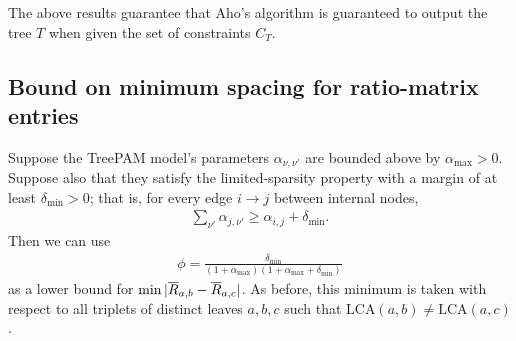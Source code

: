 \documentclass{article}
\theoremstyle{definition}
\newcommand{\deltaMin}{\delta_{\text{min}}}
\newcommand{\alphaMax}{\alpha_{\text{max}}}
\newcommand{\LCA}{\text{LCA}}
\begin{document}
The above results guarantee that Aho's algorithm is guaranteed to output the tree $T$ when given the set of constraints $C_T$.


\subsection{Bound on minimum spacing for ratio-matrix entries}
\label{sec:minimum-spacing}
Suppose the TreePAM model's parameters $\alpha_{\nu,\nu'}$ are bounded above by $\alphaMax > 0$.
Suppose also that they satisfy the limited-sparsity property with a margin of at least $\deltaMin > 0$; that is, for every edge $i \to j$ between internal nodes,
\begin{align*}
\sum_{\nu'} \alpha_{j,\nu'} \geq \alpha_{i,j} + \deltaMin.
\end{align*}
Then we can use
\begin{align*}
\phi = \frac{\deltaMin}{(1+\alphaMax)(1+\alphaMax+\deltaMin)}
\end{align*}
as a lower bound for $\min |\overline{R}_{a,b} - \overline{R}_{a,c}|$.
As before, this minimum is taken with respect to all triplets of distinct leaves $a, b, c$ such that $\LCA(a,b) \neq \LCA(a,c)$.
\end{document}
